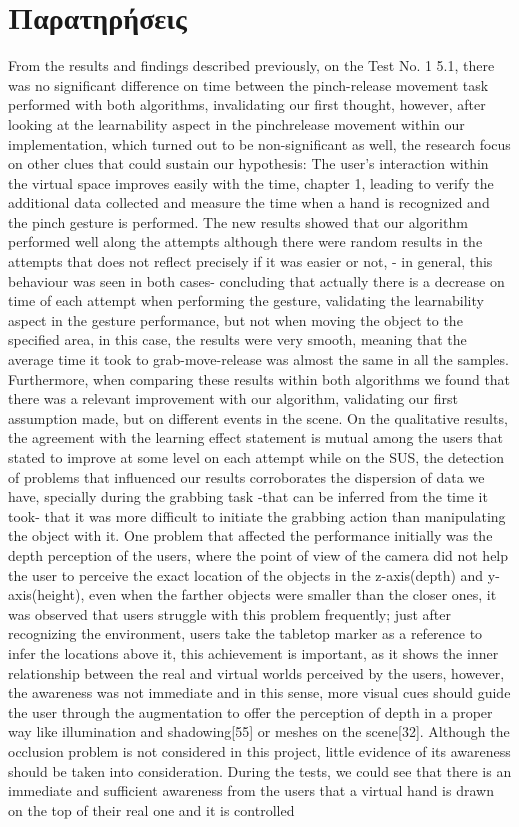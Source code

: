 \section{Παρατηρήσεις}


From the results and findings described previously, on the Test No. 1 5.1, there was no significant difference on time between the pinch-release movement task performed with both algorithms, invalidating our first thought, however, after looking at the learnability aspect in the pinchrelease movement within our implementation, which turned out to be non-significant as well, the research focus on other clues that could sustain our hypothesis: The user’s interaction within the virtual space improves easily with the time, chapter 1, leading to verify the additional data collected and measure the time when a hand is recognized and the pinch gesture is performed. The new results showed that our algorithm performed well along the attempts although there were random results in the attempts that does not reflect precisely if it was easier or not, - in general, this behaviour was seen in both cases- concluding that actually there is a decrease on time of each attempt when performing the gesture, validating the learnability aspect in the gesture performance, but not when moving the object to the specified area, in this case, the results were very smooth, meaning that the average time it took to grab-move-release was almost the same in all the samples. Furthermore, when comparing these results within both algorithms we found that there was a relevant improvement with our algorithm, validating our first assumption made, but on different events in the scene. On the qualitative results, the agreement with the learning effect statement is mutual among the users that stated to improve at some level on each attempt while on the SUS, the detection of problems that influenced our results corroborates the dispersion of data we have, specially during the grabbing task -that can be inferred from the time it took- that it was more difficult to initiate the grabbing action than manipulating the object with it. One problem that affected the performance initially was the depth perception of the users, where the point of view of the camera did not help the user to perceive the exact location of the objects in the z-axis(depth) and y-axis(height), even when the farther objects were smaller than the closer ones, it was observed that users struggle with this problem frequently; just after recognizing the environment, users take the tabletop marker as a reference to infer the locations above it, this achievement is important, as it shows the inner relationship between the real and virtual worlds perceived by the users, however, the awareness was not immediate and in this sense, more visual cues should guide the user through the augmentation to offer the perception of depth in a proper way like illumination and shadowing[55] or meshes on the scene[32]. Although the occlusion problem is not considered in this project, little evidence of its awareness should be taken into consideration. During the tests, we could see that there is an immediate and sufficient awareness from the users that a virtual hand is drawn on the top of their real one and it is controlled 